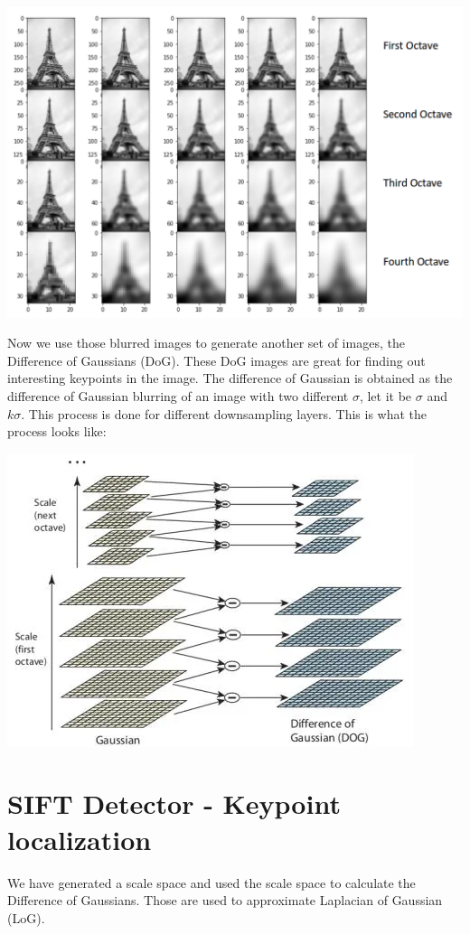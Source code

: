 \documentclass{article}
\begin{document}
\begin{center}
    \includegraphics[width=.9\linewidth]{images/octaves.png}
\end{center}

Now we use those blurred images to generate another set of images, the Difference of Gaussians (DoG). These DoG images are great for finding out interesting keypoints in the image. The difference of Gaussian is obtained as the difference of Gaussian blurring of an image with two different $\sigma$, let it be $\sigma$ and $k\sigma$. This process is done for different downsampling layers. This is what the process looks like:

\begin{center}
    \includegraphics[width=.6\linewidth]{images/octave_dog.png}
\end{center}

\section*{SIFT Detector - Keypoint localization}

We have generated a scale space and used the scale space to calculate the Difference of Gaussians. Those are used to approximate Laplacian of Gaussian (LoG).
\end{document}
